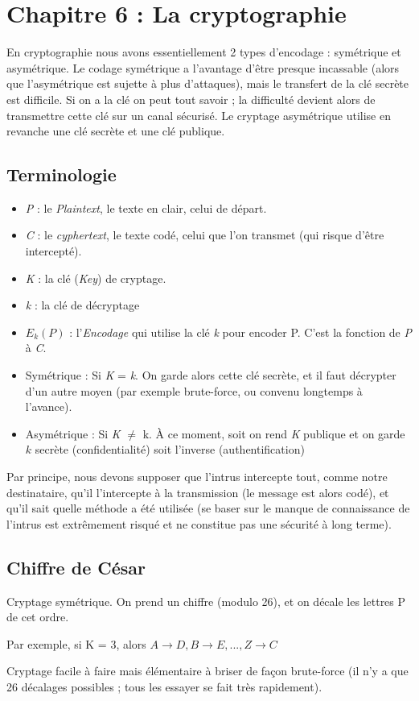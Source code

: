 \documentclass[11pt,a4paper]{article}
\begin{document}
\section[Cryptographie]{Chapitre 6 : La cryptographie}
En cryptographie nous avons essentiellement 2 types d'encodage : symétrique et asymétrique. Le codage symétrique a l'avantage d'être presque incassable (alors que l'asymétrique est sujette à plus d'attaques), mais le transfert de la clé secrète est difficile. Si on a la clé on peut tout savoir ; la difficulté devient alors de transmettre cette clé sur un canal sécurisé. Le cryptage asymétrique utilise en revanche une clé secrète et une clé publique.
\subsection{Terminologie}
\begin{multicols}{2}
	\begin{itemize}
		\item 	\textit{P} : le \textit{Plaintext}, le texte en clair, celui de départ.
		\item 	\textit{C} : le \textit{cyphertext}, le texte codé, celui que l'on transmet (qui risque d'être intercepté).		
		\item 	\textit{K} : la clé (\textit{Key}) de cryptage.
		\item	\textit{k} : la clé de décryptage 
		\item 	$E_k(P)$ : l'\textit{Encodage} qui utilise la clé \textit{k} pour encoder P. C'est la fonction de \textit{P} à \textit{C}.
		\item 	Symétrique : Si \textit{K} = \textit{k}. On garde alors cette clé secrète, et il faut décrypter d'un autre moyen (par exemple brute-force, ou convenu longtemps à l'avance).
		\item 	Asymétrique : Si \textit{K} $\neq$ k. À ce moment, soit on rend \textit{K} publique et on garde $k$ secrète (confidentialité) soit l'inverse (authentification)
	\end{itemize}
\end{multicols}
Par principe, nous devons supposer que l'intrus intercepte tout, comme notre destinataire, qu'il l'intercepte à la transmission (le message est alors codé), et qu'il sait quelle méthode a été utilisée (se baser sur le manque de connaissance de l'intrus est extrêmement risqué et ne constitue pas une sécurité à long terme).
\subsection{Chiffre de César}
Cryptage symétrique. On prend un chiffre (modulo 26), et on décale les lettres P de cet ordre. 
\begin{exemple}[0.65]
	Par exemple, si K = 3, alors $A \to D, B\to E,...,Z\to C$
\end{exemple}
Cryptage facile à faire mais élémentaire à briser de façon brute-force (il n'y a que 26 décalages possibles ; tous les essayer se fait très rapidement).
\end{document}
